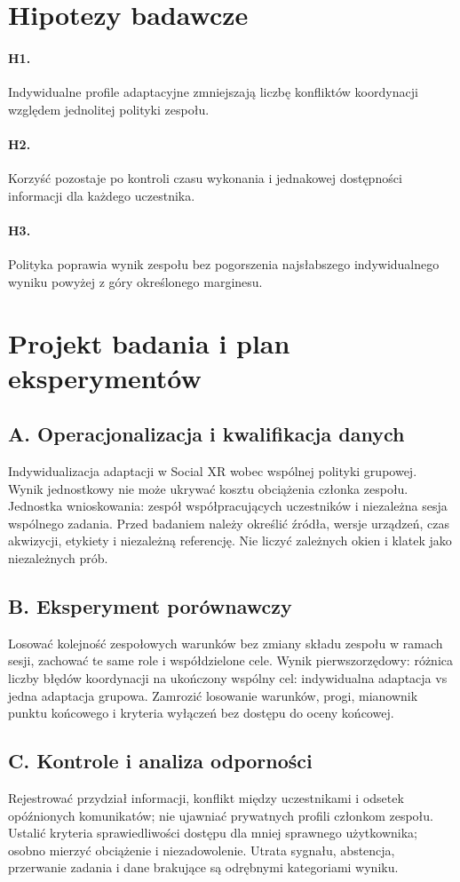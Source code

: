 \documentclass[11pt,a4paper]{article}
\begin{document}
\section{Hipotezy badawcze}
\paragraph{H1.} Indywidualne profile adaptacyjne zmniejszają liczbę konfliktów koordynacji względem jednolitej polityki zespołu.
\paragraph{H2.} Korzyść pozostaje po kontroli czasu wykonania i jednakowej dostępności informacji dla każdego uczestnika.
\paragraph{H3.} Polityka poprawia wynik zespołu bez pogorszenia najsłabszego indywidualnego wyniku powyżej z góry określonego marginesu.
\section{Projekt badania i plan eksperymentów}
\subsection{A. Operacjonalizacja i kwalifikacja danych}
Indywidualizacja adaptacji w Social XR wobec wspólnej polityki grupowej. Wynik jednostkowy nie może ukrywać kosztu obciążenia członka zespołu. Jednostka wnioskowania: zespół współpracujących uczestników i niezależna sesja wspólnego zadania. Przed badaniem należy określić źródła, wersje urządzeń, czas akwizycji, etykiety i niezależną referencję. Nie liczyć zależnych okien i klatek jako niezależnych prób.
\subsection{B. Eksperyment porównawczy}
Losować kolejność zespołowych warunków bez zmiany składu zespołu w ramach sesji, zachować te same role i współdzielone cele. Wynik pierwszorzędowy: różnica liczby błędów koordynacji na ukończony wspólny cel: indywidualna adaptacja vs jedna adaptacja grupowa. Zamrozić losowanie warunków, progi, mianownik punktu końcowego i kryteria wyłączeń bez dostępu do oceny końcowej.
\subsection{C. Kontrole i analiza odporności}
Rejestrować przydział informacji, konflikt między uczestnikami i odsetek opóźnionych komunikatów; nie ujawniać prywatnych profili członkom zespołu. Ustalić kryteria sprawiedliwości dostępu dla mniej sprawnego użytkownika; osobno mierzyć obciążenie i niezadowolenie. Utrata sygnału, abstencja, przerwanie zadania i dane brakujące są odrębnymi kategoriami wyniku.
\end{document}
